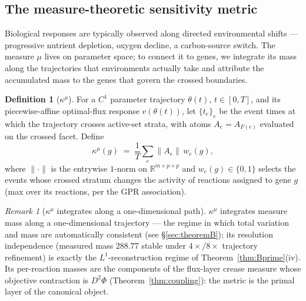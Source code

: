 \documentclass[11pt,a4paper]{article}
\theoremstyle{plain}
\theoremstyle{definition}
\newtheorem{definition}[theorem]{Definition}
\theoremstyle{remark}
\newtheorem{remark}[theorem]{Remark}
\newcommand{\kmu}{\kappa^{\mu}}
\newcommand{\RR}{\mathbb{R}}
\begin{document}
\subsection{The measure-theoretic sensitivity metric}

Biological responses are typically observed along directed environmental
shifts --- progressive nutrient depletion, oxygen decline, a
carbon-source switch. The measure $\mu$ lives on parameter space; to
connect it to genes, we integrate its mass along the trajectories that
environments actually take and attribute the accumulated mass to the
genes that govern the crossed boundaries.

\begin{definition}[$\kmu$]\label{def:kmu}
For a $C^1$ parameter trajectory $\theta(t)$, $t \in [0,T]$, and its
piecewise-affine optimal-flux response $v(\theta(t))$, let
$\{t_e\}_e$ be the event times at which the trajectory crosses active-set
strata, with atoms $A_e = A_{F(e)}$ evaluated on the crossed facet. Define
\[
\kmu(g) \;=\; \frac{1}{T}\sum_{e} \bigl\| A_e \bigr\| \, w_e(g),
\]
where $\|{\cdot}\|$ is the entrywise $1$-norm on
$\RR^{m \times p \times p}$ and $w_e(g) \in \{0,1\}$ selects the events
whose crossed stratum changes the activity of reactions assigned to gene
$g$ (max over its reactions, per the GPR association).
\end{definition}

\begin{remark}[$\kmu$ integrates along a one-dimensional path]
$\kmu$ integrates measure mass along a one-dimensional trajectory --- the
regime in which total variation and mass are automatically
consistent (see \S\ref{sec:theoremB}); its resolution
independence (measured mass $288.77$ stable under $4\times$/$8\times$
trajectory refinement) is exactly the $L^1$-reconstruction regime of
Theorem~\ref{thm:Bprime}(iv). Its per-reaction masses are the components of the
flux-layer crease measure whose objective contraction is $D^2\Phi$
(Theorem~\ref{thm:coupling}): the metric is the primal layer of the
canonical object.
\end{remark}
\end{document}
